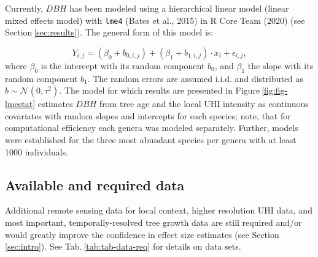 \documentclass[
]{article}
\begin{document}
Currently, \(DBH\) has been modeled using a hierarchical linear model (linear mixed effects model) with \texttt{lme4} (Bates et al., 2015) in R Core Team (2020) (see Section\(~\)\ref{sec:results}).
The general form of this model is:

\begin{equation}
Y_{i,j} = (\beta_0 + b_{0,i,j}) + (\beta_1 + b_{1,i,j}) \cdot x_i  + \epsilon_{i,j},
\label{eq:lme}
\end{equation}
where \(\beta_0\) is the intercept with its random component \(b_0\), and \(\beta_1\) the slope with its random component \(b_1\).
The random errors are assumed i.i.d. and distributed as \(b \sim \mathcal{N}(0, \tau ^2)\).
The model for which results are presented in Figure\(~\)\ref{fig:fig-lmestat} estimates \(DBH\) from tree age and the local UHI intensity as continuous covariates with random slopes and intercepts for each species;
note, that for computational efficiency each genera was modeled separately.
Further, models were established for the three most abundant species per genera with at least 1000 individuals.

\hypertarget{available-and-required-data}{%
\subsection{Available and required data}\label{available-and-required-data}}

Additional remote sensing data for local context, higher resolution UHI data, and most important, temporally-resolved tree growth data are still required and/or would greatly improve the confidence in effect size estimates (see Section\(~\)\ref{sec:intro}).
See Tab.\(~\)\ref{tab:tab-data-req} for details on data sets.
\end{document}
